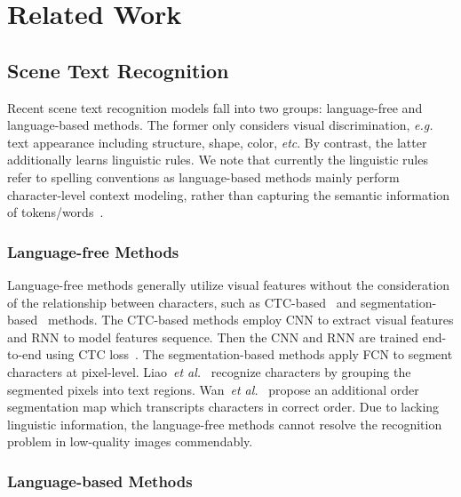 \documentclass[10pt,journal,compsoc]{IEEEtran}
\def\etal{{\it et al.}\xspace}
\def\eg{{\it e.g.}\xspace}
\def\etc{{\it etc}\xspace}
\begin{document}
\section{Related Work}
\label{sec:related-works}

\subsection{Scene Text Recognition}

Recent scene text recognition models fall into two groups: language-free and language-based methods. The former only considers visual discrimination, \eg text appearance including structure, shape, color, \etc. By contrast, the latter additionally learns linguistic rules. We note that currently the linguistic rules refer to spelling conventions as language-based methods mainly perform character-level context modeling, rather than capturing the semantic information of tokens/words~\cite{devlin2018bert, radford2018improving}.

\subsubsection{Language-free Methods} 

Language-free methods generally utilize visual features without the consideration of the relationship between characters, such as CTC-based~\cite{graves2006connectionist} and segmentation-based~\cite{li2017fully} methods. The CTC-based methods employ CNN to extract visual features and RNN to model features sequence. Then the CNN and RNN are trained end-to-end using CTC loss~\cite{shi2016end,he2016reading,su2017accurate,hu2020gtc}. The segmentation-based methods apply FCN to segment characters at pixel-level. Liao~\etal~\cite{liao2019mask} recognize characters by grouping the segmented pixels into text regions. Wan~\etal~\cite{wan2019textscanner} propose an additional order segmentation map which transcripts characters in correct order. Due to lacking linguistic information, the language-free methods cannot resolve the recognition problem in low-quality images commendably.

\subsubsection{Language-based Methods}
\end{document}
